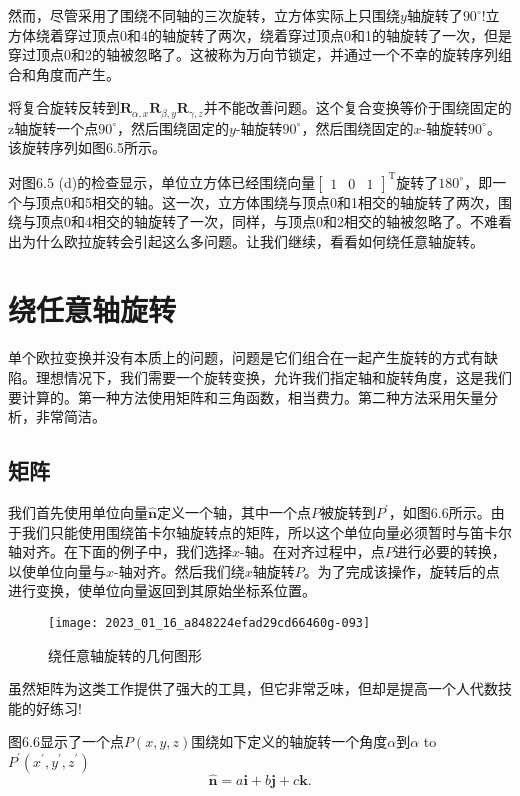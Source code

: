 然而，尽管采用了围绕不同轴的三次旋转，立方体实际上只围绕$y$轴旋转了$90^{\circ}$!立方体绕着穿过顶点0和4的轴旋转了两次，绕着穿过顶点0和1的轴旋转了一次，但是穿过顶点0和2的轴被忽略了。这被称为万向节锁定，并通过一个不幸的旋转序列组合和角度而产生。

将复合旋转反转到$\mathbf{R}_{\alpha, x} \mathbf{R}_{\beta, y} \mathbf{R}_{\gamma, z}$并不能改善问题。这个复合变换等价于围绕固定的z轴旋转一个点$90^{\circ}$，然后围绕固定的$y$-轴旋转$90^{\circ}$，然后围绕固定的$x$-轴旋转$90^{\circ}$。该旋转序列如图6.5所示。

对图$6.5$ (d)的检查显示，单位立方体已经围绕向量$\left[\begin{array}{lll}1 & 0 & 1\end{array}\right]^{\mathrm{T}}$旋转了$180^{\circ}$，即一个与顶点0和5相交的轴。这一次，立方体围绕与顶点0和1相交的轴旋转了两次，围绕与顶点0和4相交的轴旋转了一次，同样，与顶点0和2相交的轴被忽略了。不难看出为什么欧拉旋转会引起这么多问题。让我们继续，看看如何绕任意轴旋转。



\section{绕任意轴旋转}
单个欧拉变换并没有本质上的问题，问题是它们组合在一起产生旋转的方式有缺陷。理想情况下，我们需要一个旋转变换，允许我们指定轴和旋转角度，这是我们要计算的。第一种方法使用矩阵和三角函数，相当费力。第二种方法采用矢量分析，非常简洁。

\subsection{矩阵}
我们首先使用单位向量$\hat{\mathbf{n}}$定义一个轴，其中一个点$P$被旋转到$P^{\prime}$，如图6.6所示。由于我们只能使用围绕笛卡尔轴旋转点的矩阵，所以这个单位向量必须暂时与笛卡尔轴对齐。在下面的例子中，我们选择$x$-轴。在对齐过程中，点$P$进行必要的转换，以使单位向量与$x$-轴对齐。然后我们绕$x$轴旋转$P$。为了完成该操作，旋转后的点进行变换，使单位向量返回到其原始坐标系位置。

\begin{figure}[h!]
    \centering
    \texttt{[image: 2023\_01\_16\_a848224efad29cd66460g-093]}
    \caption[short]{绕任意轴旋转的几何图形}
\end{figure}

虽然矩阵为这类工作提供了强大的工具，但它非常乏味，但却是提高一个人代数技能的好练习!

图$6.6$显示了一个点$P(x, y, z)$围绕如下定义的轴旋转一个角度$\alpha$到$\alpha$ to $P^{\prime}\left(x^{\prime}, y^{\prime}, z^{\prime}\right)$ 
$$
\hat{\mathbf{n}}=a \mathbf{i}+b \mathbf{j}+c \mathbf{k} .
$$

